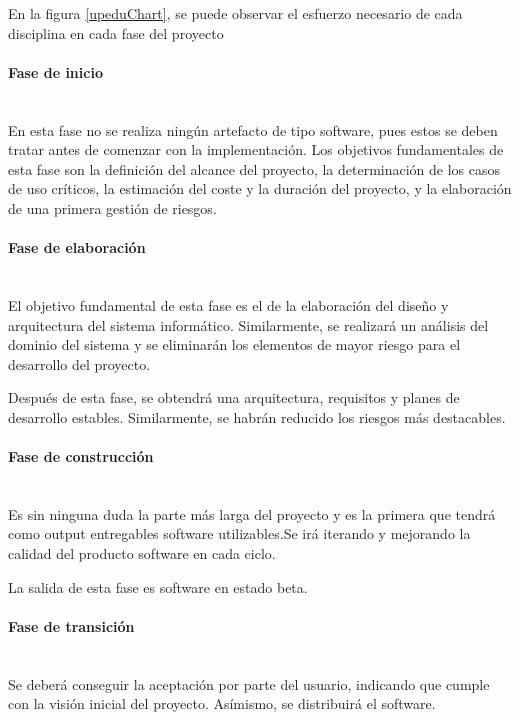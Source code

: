 \documentclass[twoside]{report}
\begin{document}
En la figura \ref{upeduChart}, se puede observar el esfuerzo necesario de cada disciplina en cada fase del proyecto

\paragraph{Fase de inicio}\mbox{}\\

En esta fase no se realiza ningún artefacto de tipo software, pues estos se deben tratar antes de comenzar con la implementación. Los objetivos fundamentales de esta fase son la definición del alcance del proyecto,  la determinación de los casos de uso críticos, la estimación del coste y la duración del proyecto, y la elaboración de una primera gestión de riesgos.

\paragraph{Fase de elaboración}\mbox{}\\

El objetivo fundamental de esta fase \cite{pgpup} es el de la elaboración del diseño y arquitectura del sistema informático. Similarmente, se realizará un análisis del dominio del sistema y se eliminarán los elementos de mayor riesgo para el desarrollo del proyecto.

Después de esta fase, se obtendrá una arquitectura, requisitos y planes de desarrollo estables. Similarmente, se habrán reducido los riesgos más destacables.

\paragraph{Fase de construcción}\mbox{}\\

Es sin ninguna duda la parte más larga del proyecto y es la primera que tendrá como output entregables software utilizables.Se irá iterando y mejorando la calidad del producto software en cada ciclo.

La salida de esta fase \cite{pgpup} es software en estado beta.

\paragraph{Fase de transición}\mbox{}\\

Se deberá conseguir la aceptación por parte del usuario, indicando que cumple con la visión inicial del proyecto. Asímismo, se distribuirá el software.
\end{document}
